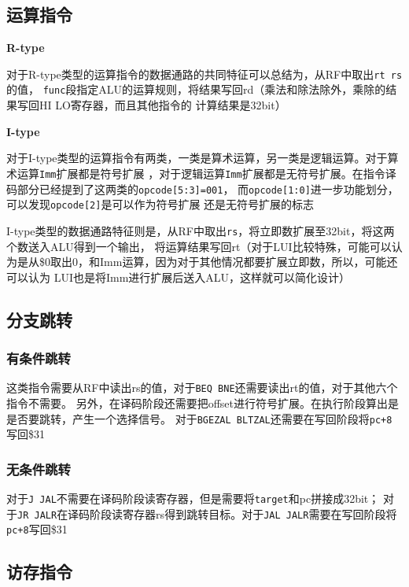 \documentclass[UTF8]{ctexart}
\begin{document}
\subsection{运算指令}

\textbf{R-type}

对于R-type类型的运算指令的数据通路的共同特征可以总结为，从RF中取出\texttt{rt rs}的值，
\texttt{func}段指定ALU的运算规则，将结果写回rd（乘法和除法除外，乘除的结果写回HI LO寄存器，而且其他指令的
计算结果是32bit）

\textbf{I-type}

对于I-type类型的运算指令有两类，一类是算术运算，另一类是逻辑运算。对于算术运算\texttt{Imm}扩展都是符号扩展
，对于逻辑运算\texttt{Imm}扩展都是无符号扩展。在指令译码部分已经提到了这两类的\texttt{opcode[5:3]=001}，
而\texttt{opcode[1:0]}进一步功能划分，可以发现\texttt{opcode[2]}是可以作为符号扩展
还是无符号扩展的标志

I-type类型的数据通路特征则是，从RF中取出\texttt{rs}，将立即数扩展至32bit，将这两个数送入ALU得到一个输出，
将运算结果写回rt（对于LUI比较特殊，可能可以认为是从\$0取出0，和Imm运算，因为对于其他情况都要扩展立即数，所以，可能还可以认为
LUI也是将Imm进行扩展后送入ALU，这样就可以简化设计）


\subsection{分支跳转}

\subsubsection{有条件跳转}

这类指令需要从RF中读出rs的值，对于\texttt{BEQ BNE}还需要读出rt的值，对于其他六个指令不需要。
另外，在译码阶段还需要把offset进行符号扩展。在执行阶段算出是是否要跳转，产生一个选择信号。
对于\texttt{BGEZAL BLTZAL}还需要在写回阶段将\texttt{pc+8}写回\$31

\subsubsection{无条件跳转}

对于\texttt{J JAL}不需要在译码阶段读寄存器，但是需要将\texttt{target}和pc拼接成32bit；
对于\texttt{JR JALR}在译码阶段读寄存器rs得到跳转目标。对于\texttt{JAL JALR}需要在写回阶段将\texttt{pc+8}写回\$31

\subsection{访存指令}
\end{document}
